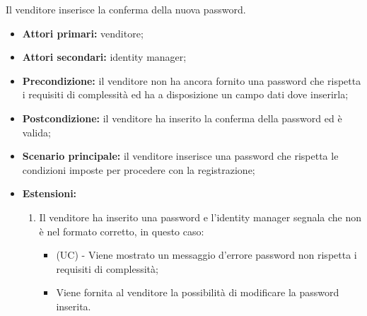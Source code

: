 Il venditore inserisce la conferma della nuova password.
\begin{itemize}
	\item \textbf{Attori primari:} venditore;
	\item \textbf{Attori secondari:} identity manager;
	\item \textbf{Precondizione:} il venditore non ha ancora fornito una password che rispetta i requisiti di complessità ed ha a disposizione un campo dati dove inserirla;
	\item \textbf{Postcondizione:} il venditore ha inserito la conferma della password ed è valida;
	\item \textbf{Scenario principale:} il venditore inserisce una password che rispetta le condizioni imposte per procedere con la registrazione;
	\item \textbf{Estensioni:}
	\begin{enumerate}[label=\lett]
		\item Il venditore ha inserito una password e l'identity manager segnala che non è nel formato corretto, in questo caso:
		\begin{itemize}
			\item (UC) - Viene mostrato un messaggio d'errore password non rispetta i requisiti di complessità;
			\item Viene fornita al venditore la possibilità di modificare la password inserita.
		\end{itemize}
	\end{enumerate} 
\end{itemize}


